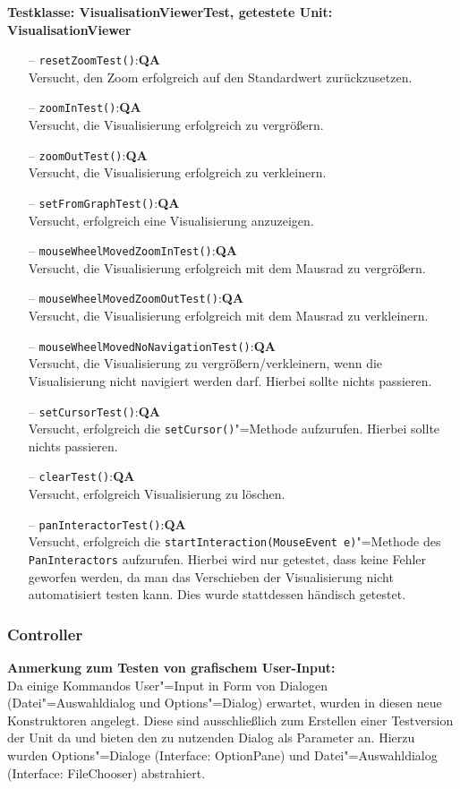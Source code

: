 \documentclass[parskip=full,11pt,twoside]{scrartcl}
\def\qa{\hfill\textbf{QA}}
\begin{document}
\textbf{Testklasse: VisualisationViewerTest, getestete Unit: VisualisationViewer}
\begin{itemize}
	\item[--] \texttt{resetZoomTest()}:\qa\\
	Versucht, den Zoom erfolgreich auf den Standardwert zurückzusetzen.
	\item[--] \texttt{zoomInTest()}:\qa\\
	Versucht, die Visualisierung erfolgreich zu vergrößern.
	\item[--] \texttt{zoomOutTest()}:\qa\\
	Versucht, die Visualisierung erfolgreich zu verkleinern.
	\item[--] \texttt{setFromGraphTest()}:\qa\\
	Versucht, erfolgreich eine Visualisierung anzuzeigen.
	\item[--] \texttt{mouseWheelMovedZoomInTest()}:\qa\\
	Versucht, die Visualisierung erfolgreich mit dem Mausrad zu vergrößern.
	\item[--] \texttt{mouseWheelMovedZoomOutTest()}:\qa\\
	Versucht, die Visualisierung erfolgreich mit dem Mausrad zu verkleinern.
	\item[--] \texttt{mouseWheelMovedNoNavigationTest()}:\qa\\
	Versucht, die Visualisierung zu vergrößern/verkleinern, wenn die Visualisierung nicht navigiert werden darf. Hierbei sollte nichts passieren.
	\item[--] \texttt{setCursorTest()}:\qa\\
	Versucht, erfolgreich die \texttt{setCursor()}"=Methode aufzurufen. Hierbei sollte nichts passieren.
	\item[--] \texttt{clearTest()}:\qa\\
	Versucht, erfolgreich Visualisierung zu löschen.
	\item[--] \texttt{panInteractorTest()}:\qa\\
	Versucht, erfolgreich die \texttt{startInteraction(MouseEvent e)}"=Methode des\\\texttt{PanInteractors} aufzurufen. Hierbei wird nur getestet, dass keine Fehler geworfen werden, da man das Verschieben der Visualisierung nicht automatisiert testen kann. Dies wurde stattdessen händisch getestet.
\end{itemize}

\subsubsection{Controller}
\textbf{Anmerkung zum Testen von grafischem User-Input:}\\
Da einige Kommandos User"=Input in Form von Dialogen (Datei"=Auswahldialog und Options"=Dialog) erwartet, wurden in diesen neue Konstruktoren angelegt. Diese sind ausschließlich zum Erstellen einer Testversion der Unit da und bieten den zu nutzenden Dialog als Parameter an. Hierzu wurden Options"=Dialoge (Interface: OptionPane) und Datei"=Auswahldialog (Interface: FileChooser) abstrahiert.
\end{document}

